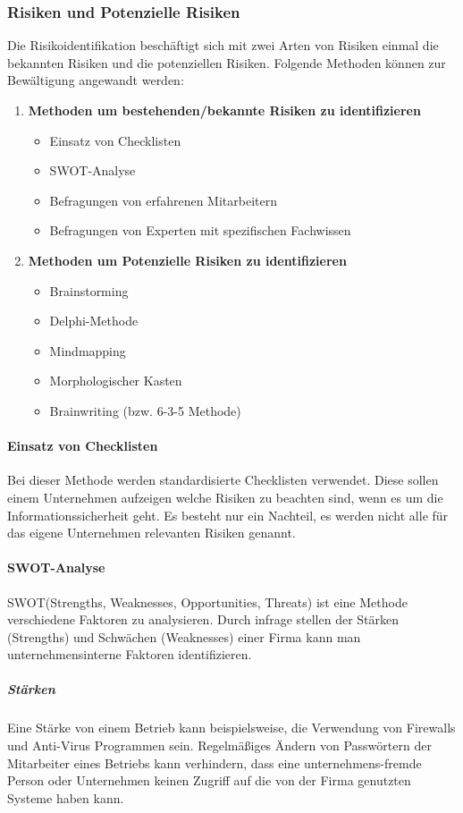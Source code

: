 \subsubsection{Risiken und Potenzielle Risiken}
Die Risikoidentifikation beschäftigt sich mit zwei Arten von Risiken einmal die bekannten Risiken und die potenziellen Risiken. Folgende Methoden können zur Bewältigung angewandt werden:
\begin{enumerate}
    \item \textbf{Methoden um bestehenden/bekannte Risiken zu identifizieren}
    \begin{itemize}
        \item Einsatz von Checklisten
        \item SWOT-Analyse
        \item Befragungen von erfahrenen Mitarbeitern
        \item Befragungen von Experten mit spezifischen Fachwissen
    \end{itemize}
    \item \textbf{Methoden um Potenzielle Risiken zu identifizieren}
    \begin{itemize}
    	\item Brainstorming
    	\item Delphi-Methode
    	\item Mindmapping
    	\item Morphologischer Kasten
    	\item Brainwriting (bzw. 6-3-5 Methode)
    \end{itemize}
\end{enumerate}

\paragraph{Einsatz von Checklisten}
Bei dieser Methode werden standardisierte Checklisten verwendet. Diese sollen einem Unternehmen aufzeigen welche Risiken zu beachten sind, wenn es um die Informationssicherheit geht. Es besteht nur ein Nachteil, es werden nicht alle für das eigene Unternehmen relevanten Risiken genannt.

\paragraph{SWOT-Analyse}
SWOT(Strengths, Weaknesses, Opportunities, Threats) ist eine Methode verschiedene Faktoren zu analysieren. 
Durch infrage stellen der Stärken (Strengths) und Schwächen (Weaknesses) einer Firma kann man unternehmensinterne Faktoren identifizieren.
\subparagraph{Stärken}
Eine Stärke von einem Betrieb kann beispielsweise, die Verwendung von Firewalls und Anti-Virus Programmen sein. Regelmäßiges Ändern von Passwörtern der Mitarbeiter eines Betriebs kann verhindern, dass eine unternehmens-fremde Person oder Unternehmen keinen Zugriff auf die von der Firma genutzten Systeme haben kann.

